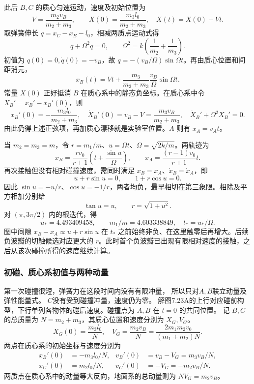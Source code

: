 \documentclass[UTF8,fontset=fandol,a4paper,11pt]{ctexart}
\newcommand{\figcaption}[1]{\par\vspace{2pt}{\small\color{muted}#1}\par}
\begin{document}
此后 $B,C$ 的质心匀速运动，速度及初始位置为
\[V=\frac{m_2v_B}{m_2+m_3},\qquad
X(0)=\frac{m_3l_0}{m_2+m_3},\quad X(t)=X(0)+Vt.\]
取弹簧伸长 $q=x_C-x_B-l_0$，相减两质点运动式得
\[\ddot q+\Omega^2q=0,\qquad
\Omega^2=k\left(\frac1{m_2}+\frac1{m_3}\right).\]
初值为 $q(0)=0,\dot q(0)=-v_B$，故 $q=-(v_B/\Omega)\sin\Omega t$。再由质心位置和间距消元，
\[\boxed{x_B(t)=Vt+\frac{m_3}{m_2+m_3}\frac{v_B}{\Omega}\sin\Omega t.}\]
常量 $X(0)$ 正好抵消 $B$ 在质心系中的静态负坐标。在质心系中令 $X_B'=x_B'-x_B'(0)$，则
\[x_B'(0)=-\frac{m_3l_0}{m_2+m_3},\quad
\dot X_B'(0)=v_B-V=\frac{m_3v_B}{m_2+m_3},\quad
\ddot X_B'+\Omega^2X_B'=0.\]
由此仍得上述正弦项，再加质心漂移就是实验室位置。$A$ 则有 $x_A=v_At$。
\begin{center}\begin{minipage}{\linewidth}\centering{}\figcaption{解图 7.23B}\end{minipage}\end{center}
当 $m_2=m_3=m$，令 $r=m_1/m$、$u=\Omega t$、$\Omega=\sqrt{2k/m}$。两轨迹为
\[x_B=\frac{rv_0}{r+1}\left(t+\frac{\sin u}{\Omega}\right),
\qquad x_A=\frac{(r-1)v_0}{r+1}t.\]
再次接触但没有相对碰撞速度，需同时满足 $x_B=x_A$、$\dot x_B=\dot x_A$，即
\[u+r\sin u=0,\qquad 1+r\cos u=0.\]
因此 $\sin u=-u/r$、$\cos u=-1/r$，两者均负，最早相切在第三象限。相除及平方相加分别给
\[\tan u=u,\qquad r=\sqrt{1+u^2}.\]
对 $(\pi,3\pi/2)$ 内的根迭代，得
\[u_*=4.493409458,\qquad
\boxed{m_1/m=4.603338849,\quad t_*=u_*/\Omega.}\]
图中间隙 $x_B-x_A\propto u+r\sin u$ 在 $t_*$ 之前始终非负、在这里触零后再增大。后续负波瓣的切触候选对应更大的 $r$。此时首个负波瓣已出现有限相对速度的接触，之后从该次碰撞所得的速度继续计算。
\subsubsection*{初碰、质心系初值与两种动量}
第一次碰撞很短，弹簧力在这段时间内没有有限冲量，
所以只对$A,B$联立动量及弹性能量式。
$C$没有受到碰撞冲量，速度仍为零。
解图7.23A的上行对应碰前构型，下行单列各物体的碰后速度。碰撞点为 $A,B$ 在 $t=0$ 的共同位置。
记 $B,C$ 的总质量为 $N=m_2+m_3$，其质心位置和速度分别为 $X_G,V_G$。
\[
X_G(0)=\frac{m_3l_0}{N},\quad
V_G=\frac{m_2v_B}{N}
=\frac{2m_1m_2v_0}{(m_1+m_2)N}.
\]
两点在质心系的初始坐标与速度分别为
\[
\begin{aligned}
x_B'(0)&=-m_3l_0/N,&v_B'(0)&=v_B-V_G=m_3v_B/N,\\
x_C'(0)&=m_2l_0/N,&v_C'(0)&=-V_G=-m_2v_B/N.
\end{aligned}
\]
两质点在质心系中的动量等大反向，地面系的总动量则为 $NV_G=m_2v_B$。
\end{document}
